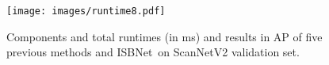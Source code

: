 \documentclass[10pt,twocolumn,letterpaper]{article}
\def\Approach{ISBNet}
\begin{document}

\begin{figure}[t]
  \centering
  \texttt{[image: images/runtime8.pdf]}
  \vspace{-16pt}
    \caption{Components and total runtimes (in ms) and results in AP of five previous methods and \Approach~on ScanNetV2 validation set.}
   \label{fig:runtime_chart}
  \vspace{-6pt}
\end{figure}




\end{document}
